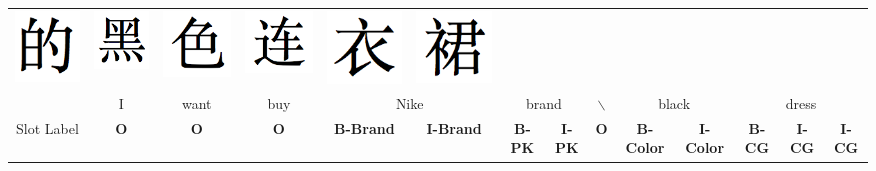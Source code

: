 \begin{table}[h]
\begin{tabular}{c|c|c|c|c|c|c|c|c|c|c|c|c|c}
		\includegraphics[height=1.8\fontcharht\font`\B]{figures/de.png} & 
		\includegraphics[height=1.8\fontcharht\font`\B]{figures/hei.png} & \includegraphics[height=1.8\fontcharht\font`\B]{figures/se.png} & \includegraphics[height=1.8\fontcharht\font`\B]{figures/lian.png} & \includegraphics[height=1.8\fontcharht\font`\B]{figures/yi.png} & \includegraphics[height=1.8\fontcharht\font`\B]{figures/qun.png} \\
		\cmidrule{2-14}
		& I & want & buy & \multicolumn{2}{c|}{Nike} & \multicolumn{2}{c|}{brand} & $\backslash$  & \multicolumn{2}{c|}{black} & \multicolumn{3}{c}{dress} \\
		\midrule
		Slot Label & \textbf{O} & \textbf{O} & \textbf{O} & \textbf{B-Brand} & \textbf{I-Brand} & \textbf{B-PK} & \textbf{I-PK} & \textbf{O} & \textbf{B-Color} & \textbf{I-Color} & \textbf{B-CG} & \textbf{I-CG} & \textbf{I-CG} \\

\end{tabular}
\end{table}
